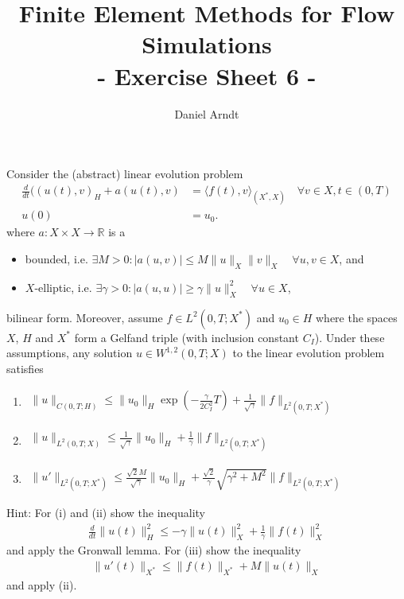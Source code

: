 \documentclass[12pt]{article}
\newenvironment{exercise}[2][Exercise]{\begin{trivlist}
\item[\hskip \labelsep {\bfseries #1}\hskip \labelsep {\bfseries #2.}]}{\end{trivlist}}
\begin{document}
 
\title{Finite Element Methods for Flow Simulations\\ - Exercise Sheet 6 -}
\author{Daniel Arndt}
\date{}
 
\maketitle

\begin{exercise}{11}
Consider the (abstract) linear evolution problem
\begin{align*}
 \frac{d}{dt}((u(t),v)_H+a(u(t),v)&=\langle f(t),v \rangle_{(X^*,X)} \quad \forall v\in X, t\in (0,T) \\
 u(0) &= u_0.
\end{align*}
where $a\colon X\times X \to \mathbb{R}$ is a
\begin{itemize}
 \item bounded, i.e. $\exists M>0\colon |a(u,v)|\leq M\|u\|_X\|v\|_X \quad \forall u,v\in X$, and 
 \item $X$-elliptic, i.e. $\exists \gamma>0\colon |a(u,u)|\geq \gamma\|u\|_X^2 \quad \forall u\in X$,
\end{itemize}
bilinear form. Moreover, assume $f\in L^2(0,T;X^*)$ and $u_0 \in H$ where the spaces $X$, $H$ and $X^*$
form a Gelfand triple (with inclusion constant $C_I$).
Under these assumptions, any solution $u\in W^{1,2}(0,T;X)$ to the linear evolution problem satisfies
\begin{enumerate}
 \item $\begin{aligned}\|u\|_{C(0,T;H)}\leq \|u_0\|_H \exp\left(-\frac{\gamma}{2 C_I^2} T\right)+\frac{1}{\sqrt{\gamma}}\|f\|_{L^2(0,T;X^*)}\end{aligned}$
 \item $\begin{aligned}\|u\|_{L^2(0,T;X)}\leq \frac{1}{\sqrt{\gamma}}\|u_0\|_H+\frac{1}{\gamma}\|f\|_{L^2(0,T;X^*)}\end{aligned}$
 \item $\begin{aligned}\|u'\|_{L^2(0,T;X^*)}\leq \frac{\sqrt{2}M}{\sqrt{\gamma}}\|u_0\|_H+\frac{\sqrt{2}}{\gamma}\sqrt{\gamma^2+M^2}\|f\|_{L^2(0,T;X^*)}\end{aligned}$
\end{enumerate}
Hint: For (i) and (ii) show the inequality
\begin{align*}
 \frac{d}{dt}\|u(t)\|_H^2 \leq -\gamma \|u(t)\|_X^2+\frac{1}{\gamma} \|f(t)\|_X^2
\end{align*}
and apply the Gronwall lemma. For (iii) show the inequality
\begin{align*}
 \|u'(t)\|_{X^*}\leq\|f(t)\|_{X^*}+M\|u(t)\|_X
\end{align*}
and apply (ii).
\end{exercise}
\end{document}

